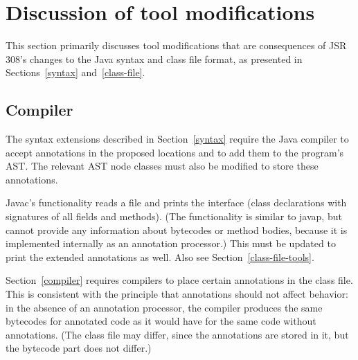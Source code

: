 \documentclass[10pt]{article}
\begin{document}
\section{Discussion of tool modifications\label{mods-discussion}}

This section primarily discusses tool modifications that are consequences
of JSR 308's changes to the Java syntax and class file format, as presented
in Sections~\ref{syntax} and~\ref{class-file}.


\subsection{Compiler\label{compiler-mods}}

The syntax extensions described in Section~\ref{syntax}
require the  Java compiler to accept annotations in the proposed
locations and to add them to the program's AST\@.  The relevant AST node
classes must also be modified to store these annotations.


Javac's  functionality reads a  file and prints
the interface (class declarations with signatures of all fields and
methods).  (The  functionality is similar to javap, but
cannot provide
any information about bytecodes or method bodies, because it is implemented
internally as an annotation processor.)
This must be updated to print the extended annotations as well.
Also see Section~\ref{class-file-tools}.


Section~\ref{compiler} requires compilers to place certain annotations
in the class file.  This is consistent with the principle that annotations
should not affect behavior:  in the absence of an annotation processor, the
compiler produces the same bytecodes for annotated code as it would have
for the same code without annotations.  (The class file may differ, since
the annotations are stored in it, but the bytecode part does not differ.)
\end{document}
